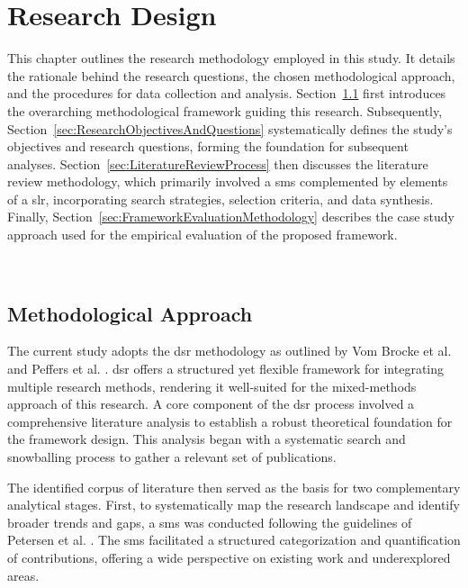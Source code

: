 
\chapter{Research Design}
\label{chp:Research_Design}

This chapter outlines the research methodology employed in this study. It details the rationale behind the research questions, the chosen methodological approach, and the procedures for data collection and analysis. Section~\ref{sec:ResearchMethodologyApproach} first introduces the overarching methodological framework guiding this research. Subsequently, Section~\ref{sec:ResearchObjectivesAndQuestions} systematically defines the study’s objectives and research questions, forming the foundation for subsequent analyses. Section~\ref{sec:LiteratureReviewProcess} then discusses the literature review methodology, which primarily involved a \gls{sms} complemented by elements of a \gls{slr}, incorporating search strategies, selection criteria, and data synthesis. Finally, Section~\ref{sec:FrameworkEvaluationMethodology} describes the case study approach used for the empirical evaluation of the proposed framework.

~\\
\vfill
\minitoc
\clearpage

\section{Methodological Approach}
\label{sec:ResearchMethodologyApproach}

The current study adopts the \gls{dsr} methodology as outlined by Vom Brocke et al. \cite{vombrockeIntroductionDesignScience2020} and Peffers et al. \cite{peffersDesignScienceResearch2012}. \Gls{dsr} offers a structured yet flexible framework for integrating multiple research methods, rendering it well-suited for the mixed-methods approach of this research. A core component of the \gls{dsr} process involved a comprehensive literature analysis to establish a robust theoretical foundation for the framework design. This analysis began with a systematic search and snowballing process to gather a relevant set of publications.

The identified corpus of literature then served as the basis for two complementary analytical stages. First, to systematically map the research landscape and identify broader trends and gaps, a \gls{sms} was conducted following the guidelines of Petersen et al. \cite{petersenGuidelinesConductingSystematic2015}. The \gls{sms} facilitated a structured categorization and quantification of contributions, offering a wide perspective on existing work and underexplored areas.


